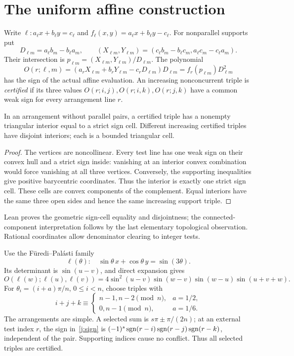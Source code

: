 \section{The uniform affine construction}\label{j:construction}

Write $\ell:a_\ell x+b_\ell y=c_\ell$ and $f_\ell(x,y)=a_\ell x+b_\ell y-c_\ell$. For nonparallel supports put
\[
 D_{\ell m}=a_\ell b_m-b_\ell a_m,\qquad
 (X_{\ell m},Y_{\ell m})=(c_\ell b_m-b_\ell c_m,a_\ell c_m-c_\ell a_m).
\]
Their intersection is $p_{\ell m}=(X_{\ell m},Y_{\ell m})/D_{\ell m}$. The polynomial
\[
 O(r;\ell,m)=(a_rX_{\ell m}+b_rY_{\ell m}-c_rD_{\ell m})D_{\ell m}
            =f_r(p_{\ell m})D_{\ell m}^2
\]
has the sign of the actual affine evaluation. An increasing nonconcurrent triple is \emph{certified} if its three values $O(r;i,j),O(r;i,k),O(r;j,k)$ have a common weak sign for every arrangement line $r$.

\begin{lemma}\label{j:cell}
In an arrangement without parallel pairs, a certified triple has a nonempty triangular interior equal to a strict sign cell. Different increasing certified triples have disjoint interiors; each is a bounded triangular cell.
\end{lemma}
\begin{proof}
The vertices are noncollinear. Every test line has one weak sign on their convex hull and a strict sign inside: vanishing at an interior convex combination would force vanishing at all three vertices. Conversely, the supporting inequalities give positive barycentric coordinates. Thus the interior is exactly one strict sign cell. These cells are convex components of the complement. Equal interiors have the same three open sides and hence the same increasing support triple.
\end{proof}
Lean proves the geometric sign-cell equality and disjointness; the connected-component interpretation follows by the last elementary topological observation. Rational coordinates allow denominator clearing to integer tests.

Use the F\"uredi--Pal\'asti family
\begin{equation}\label{j:trig}
 \ell(\theta):\quad \sin\theta\,x+\cos\theta\,y=\sin(3\theta).
\end{equation}
Its determinant is $\sin(u-v)$, and direct expansion gives
\begin{equation}\label{j:sign}
 O(\ell(w);\ell(u),\ell(v))
 =4\sin^2(u-v)\sin(w-v)\sin(w-u)\sin(u+v+w).
\end{equation}
For $\theta_i=(i+a)\pi/n$, $0\le i<n$, choose triples with
\begin{equation}\label{j:residues}
 i+j+k\equiv\begin{cases}n-1,n-2\pmod n,&a=1/2,\\0,n-1\pmod n,&a=1/6.\end{cases}
\end{equation}
The arrangements are simple. A selected sum is $s\pi\pm\pi/(2n)$; at an external test index $r$, the sign in~\eqref{j:sign} is
$(-1)^s\operatorname{sgn}(r-i)\operatorname{sgn}(r-j)\operatorname{sgn}(r-k)$, independent of the pair. Supporting indices cause no conflict. Thus all selected triples are certified.

